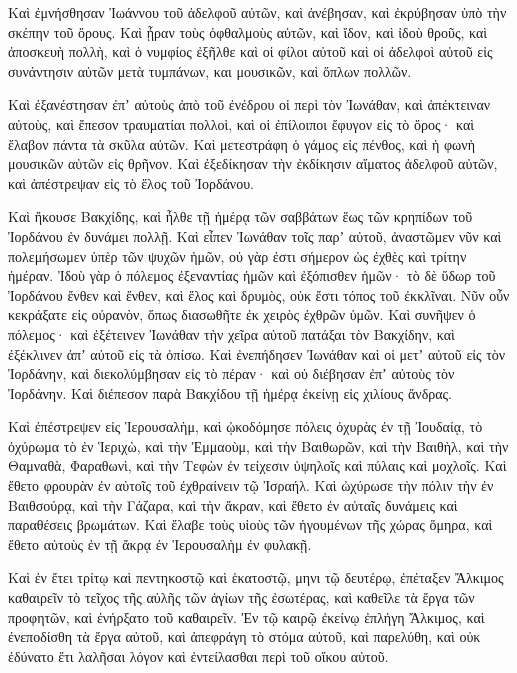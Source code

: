 {Καὶ ἐμνήσθησαν Ἰωάννου τοῦ ἀδελφοῦ αὐτῶν, καὶ ἀνέβησαν, καὶ ἐκρύβησαν ὑπὸ τὴν σκέπην τοῦ ὄρους.
Καὶ ᾖραν τοὺς ὀφθαλμοὺς αὐτῶν, καὶ ἴδον, καὶ ἰδοὺ θροῦς, καὶ ἀποσκευὴ πολλὴ, καὶ ὁ νυμφίος ἐξῆλθε καὶ οἱ φίλοι αὐτοῦ καὶ οἱ ἀδελφοὶ αὐτοῦ εἰς συνάντησιν αὐτῶν μετὰ τυμπάνων, και μουσικῶν, καὶ ὅπλων πολλῶν.
\par }{\PP {}Καὶ ἐξανέστησαν ἐπʼ αὐτοὺς ἀπὸ τοῦ ἐνέδρου οἱ περὶ τὸν Ἰωνάθαν, καὶ ἀπέκτειναν αὐτοὺς, καὶ ἔπεσον τραυματίαι πολλοὶ, καὶ οἱ ἐπίλοιποι ἔφυγον εἰς τὸ ὄρος· καὶ ἔλαβον πάντα τὰ σκῦλα αὐτῶν.
Καὶ μετεστράφη ὁ γάμος εἰς πένθος, καὶ ἡ φωνὴ μουσικῶν αὐτῶν εἰς θρῆνον.
Καὶ ἐξεδίκησαν τὴν ἐκδίκησιν αἵματος ἀδελφοῦ αὐτῶν, καὶ ἀπέστρεψαν εἰς τὸ ἕλος τοῦ Ἰορδάνου.
\par }{\PP {}Καὶ ἤκουσε Βακχίδης, καὶ ἦλθε τῇ ἡμέρᾳ τῶν σαββάτων ἕως τῶν κρηπίδων τοῦ Ἰορδάνου ἐν δυνάμει πολλῇ.
Καὶ εἶπεν Ἰωνάθαν τοῖς παρʼ αὐτοῦ, ἀναστῶμεν νῦν καὶ πολεμήσωμεν ὑπὲρ τῶν ψυχῶν ἡμῶν, οὐ γὰρ ἐστι σήμερον ὡς ἐχθὲς καὶ τρίτην ἡμέραν.
Ἰδοὺ γὰρ ὁ πόλεμος ἐξεναντίας ἡμῶν καὶ ἐξόπισθεν ἡμῶν· τὸ δὲ ὕδωρ τοῦ Ἰορδάνου ἔνθεν καὶ ἔνθεν, καὶ ἕλος καὶ δρυμὸς, οὐκ ἔστι τόπος τοῦ ἐκκλῖναι.
Νῦν οὖν κεκράξατε εἰς οὐρανὸν, ὅπως διασωθῆτε ἐκ χειρὸς ἐχθρῶν ὑμῶν.
Καὶ συνῆψεν ὁ πόλεμος· καὶ ἐξέτεινεν Ἰωνάθαν τὴν χεῖρα αὐτοῦ πατάξαι τὸν Βακχίδην, καὶ ἐξέκλινεν ἀπʼ αὐτοῦ εἰς τὰ ὀπίσω.
Καὶ ἐνεπήδησεν Ἰωνάθαν καὶ οἱ μετʼ αὐτοῦ εἰς τὸν Ἰορδάνην, καὶ διεκολύμβησαν εἰς τὸ πέραν· καὶ οὐ διέβησαν ἐπʼ αὐτοὺς τὸν Ἰορδάνην.
Καὶ διέπεσον παρὰ Βακχίδου τῇ ἡμέρᾳ ἐκείνῃ εἰς χιλίους ἄνδρας.
\par }{\PP {}Καὶ ἐπέστρεψεν εἰς Ἱερουσαλὴμ, καὶ ᾠκοδόμησε πόλεις ὀχυρὰς ἐν τῇ Ἰουδαίᾳ, τὸ ὀχύρωμα τὸ ἐν Ἱεριχὼ, καὶ τὴν Ἐμμαοὺμ, καὶ τὴν Βαιθωρῶν, καὶ τὴν Βαιθὴλ, καὶ τὴν Θαμναθὰ, Φαραθωνὶ, καὶ τὴν Τεφὼν ἐν τείχεσιν ὑψηλοῖς καὶ πύλαις καὶ μοχλοῖς.
Καὶ ἔθετο φρουρὰν ἐν αὐτοῖς τοῦ ἐχθραίνειν τῷ Ἰσραήλ.
Καὶ ὠχύρωσε τὴν πόλιν τὴν ἐν Βαιθσούρᾳ, καὶ τὴν Γάζαρα, καὶ τὴν ἄκραν, καὶ ἔθετο ἐν αὐταῖς δυνάμεις καὶ παραθέσεις βρωμάτων.
Καὶ ἔλαβε τοὺς υἱοὺς τῶν ἡγουμένων τῆς χώρας ὅμηρα, καὶ ἔθετο αὐτοὺς ἐν τῇ ἄκρᾳ ἐν Ἱερουσαλὴμ ἐν φυλακῇ.
\par }{\PP {}Καὶ ἐν ἔτει τρίτῳ καὶ πεντηκοστῷ καὶ ἑκατοστῷ, μηνι τῷ δευτέρῳ, ἐπέταξεν Ἄλκιμος καθαιρεῖν τὸ τεῖχος τῆς αὐλῆς τῶν ἁγίων τῆς ἐσωτέρας, καὶ καθεῖλε τὰ ἔργα τῶν προφητῶν, καὶ ἐνήρξατο τοῦ καθαιρεῖν.
Ἐν τῷ καιρῷ ἐκείνῳ ἐπλήγη Ἄλκιμος, καὶ ἐνεποδίσθη τὰ ἔργα αὐτοῦ, καὶ ἀπεφράγη τὸ στόμα αὐτοῦ, καὶ παρελύθη, καὶ οὐκ ἐδύνατο ἔτι λαλῆσαι λόγον καὶ ἐντείλασθαι περὶ τοῦ οἴκου αὐτοῦ.
}
